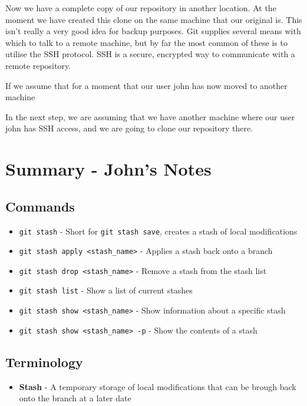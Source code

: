 Now we have a complete copy of our repository in another location.  At the moment we have created this clone on the same machine that our original is.  This isn't really a very good idea for backup purposes.  Git supplies several means with which to talk to a remote machine, but by far the most common of these is to utilise the SSH protocol.  SSH is a secure, encrypted way to communicate with a remote repository.  

If we assume that for a moment that our user john has now moved to another machine

In the next step, we are assuming that we have another machine where our user john has SSH access, and we are going to clone our repository there.


\clearpage

\section{Summary - John's Notes}
\subsection{Commands}
\begin{itemize}

\item\texttt{git stash} - Short for \texttt{git stash save}, creates a stash of local modifications

\item\texttt{git stash apply <stash\_name>} - Applies a stash back onto a branch

\item\texttt{git stash drop <stash\_name>} - Remove a stash from the stash list

\item\texttt{git stash list} - Show a list of current stashes

\item\texttt{git stash show <stash\_name>} - Show information about a specific stash

\item\texttt{git stash show <stash\_name> -p} - Show the contents of a stash

\end{itemize}

\subsection{Terminology}
\begin{itemize}
\item\textbf{Stash} - A temporary storage of local modifications that can be brough back onto the branch at a later date
\end{itemize}
